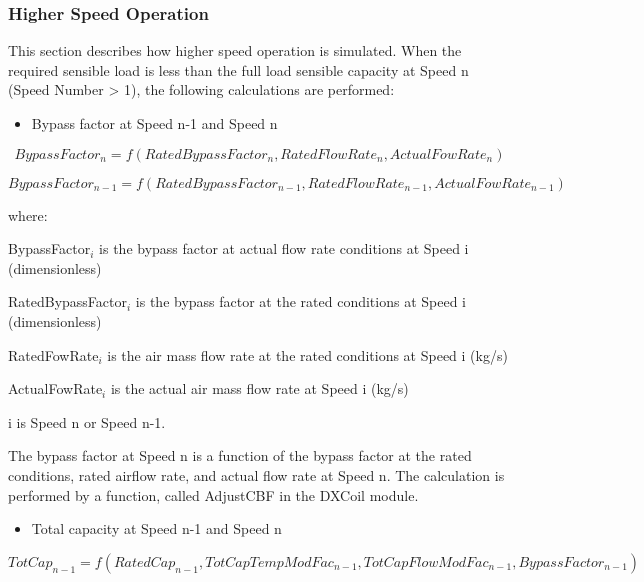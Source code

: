 \subsubsection{Higher Speed Operation}\label{higher-speed-operation-000}

This section describes how higher speed operation is simulated. When the required sensible load is less than the full load sensible capacity at Speed n (Speed Number \textgreater{} 1), the following calculations are performed:

\begin{itemize}
  \item Bypass factor at Speed n-1 and Speed n
\end{itemize}

\begin{equation}
BypassFacto{r_n} = f(RatedBypassFacto{r_n},RatedFlowRat{e_n},ActualFowRat{e_n})
\end{equation}

\begin{equation}
BypassFacto{r_{n - 1}} = f(RatedBypassFacto{r_{n - 1}},RatedFlowRat{e_{n - 1}},ActualFowRat{e_{n - 1}})
\end{equation}

where:

BypassFactor\(_{i}\) is the bypass factor at actual flow rate conditions at Speed i (dimensionless)

RatedBypassFactor\(_{i}\) is the bypass factor at the rated conditions at Speed i (dimensionless)

RatedFowRate\(_{i}\) is the air mass flow rate at the rated conditions at Speed i (kg/s)

ActualFowRate\(_{i}\) is the actual air mass flow rate at Speed i (kg/s)

i is Speed n or Speed n-1.

The bypass factor at Speed n is a function of the bypass factor at the rated conditions, rated airflow rate, and actual flow rate at Speed n. The calculation is performed by a function, called AdjustCBF in the DXCoil module.

\begin{itemize}
  \item Total capacity at Speed n-1 and Speed n
\end{itemize}

\begin{equation}
  TotCa{p_{n - 1}} = f(RatedCa{p_{n - 1}},TotCapTempModFa{c_{n - 1}},TotCapFlowModFa{c_{n - 1}},BypassFacto{r_{n - 1}})
\end{equation}

